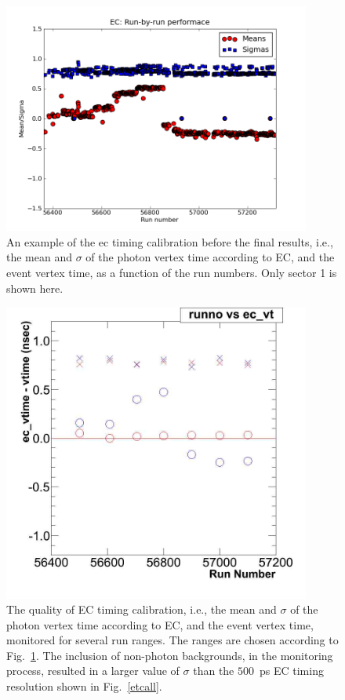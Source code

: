 \begin{figure}[h]
\begin{center}
 \includegraphics[width=0.9\textwidth]{figures/calib/ec/ec_vtimebyrunsec.png}
  \caption{An example of the ec timing calibration before the final results, i.e., the mean and $\sigma$ of the photon vertex time according to EC, and the event vertex time, as a function of the run numbers. Only sector 1 is shown here.}
  \label{ectrunsec}
  \end{center}
\end{figure}

\begin{figure}[h]
\begin{center}
 \includegraphics[width=0.9\textwidth]{figures/calib/ec/ec_vtimebyrun.png}
  \caption{The quality of EC timing calibration, i.e., the mean and $\sigma$ of the photon vertex time according to EC, and the event vertex time, monitored for several run ranges. The ranges are chosen according to Fig.~\ref{ectrunsec}. The inclusion of non-photon backgrounds, in the monitoring process, resulted in a larger value of $\sigma$ than the $500$~ps EC timing resolution shown in Fig.~\ref{etcall}. }
  \label{ectrun}
  \end{center}
\end{figure}

